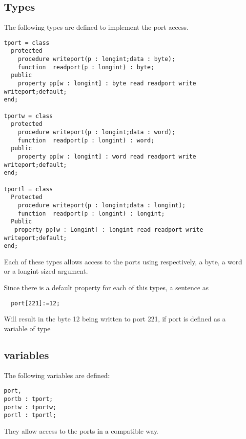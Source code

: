 \subsection{Types}
The following types are defined to implement the port access.
\begin{verbatim}
tport = class
  protected
    procedure writeport(p : longint;data : byte);
    function  readport(p : longint) : byte;
  public
    property pp[w : longint] : byte read readport write writeport;default;
end;

tportw = class
  protected
    procedure writeport(p : longint;data : word);
    function  readport(p : longint) : word;
  public
    property pp[w : longint] : word read readport write writeport;default;
end;

tportl = class
  Protected
    procedure writeport(p : longint;data : longint);
    function  readport(p : longint) : longint;
  Public
   property pp[w : Longint] : longint read readport write writeport;default;
end;
\end{verbatim}
Each of these types allows access to the ports using respectively, a byte, a
word or a longint sized argument.

Since there is a default property for each of this types, a sentence as
\begin{verbatim}
  port[221]:=12;
\end{verbatim}
Will result in the byte 12 being written to port 221, if port is defined
as a variable of type 
\subsection{variables}       
The following variables are defined:
\begin{verbatim}
port,
portb : tport;
portw : tportw;
portl : tportl;
\end{verbatim}
They allow access to the ports in a \tp compatible way.
